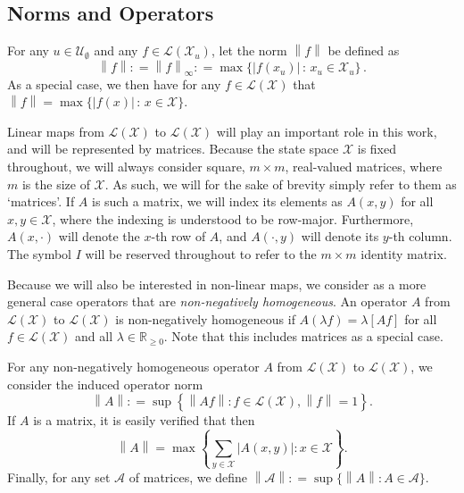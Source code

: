 \documentclass[10pt,a4paper]{paper}
\theoremstyle{definition}
\newcommand{\reals}{\mathbb{R}}
\newcommand{\realsnonneg}{\reals_{\geq 0}}
\newcommand{\states}{\mathcal{X}}
\newcommand{\gambles}{\mathcal{L}}
\newcommand{\gamblesX}{\gambles(\states)}
\newcommand{\norm}[1]{\left\lVert #1 \right\rVert}
\newcommand{\abs}[1]{\left\vert #1 \right\vert}
\newcommand{\coloneqq}{:\!=}
\begin{document}

\subsection{Norms and Operators}\label{sec:func_oper_norm}

For any $u\in\mathcal{U}_\emptyset$ and any $f\in\gambles(\states_u)$, let the norm $\norm{f}$ be defined as
\begin{equation*}
\norm{f} \coloneqq \norm{f}_{\infty} \coloneqq \max\{\abs{f(x_u)}\,:\,x_u\in\states_u\}\,.
\end{equation*}
As a special case, we then have for any $f\in\gamblesX$ that $\norm{f}=\max\{\abs{f(x)}\,:\,x\in\states\}$.

Linear maps from $\gamblesX$ to $\gamblesX$ will play an important role in this work, and will be represented by matrices. Because the state space $\states$ is fixed throughout, we will always consider square, $m\times m$, real-valued matrices, where $m$ is the size of $\states$. As such, we will for the sake of brevity simply refer to them as `matrices'. If $A$ is such a matrix, we will index its elements as $A(x,y)$ for all $x,y\in\states$, where the indexing is understood to be row-major. Furthermore, $A(x,\cdot)$ will denote the $x$-th row of $A$, and $A(\cdot,y)$ will denote its $y$-th column. The symbol $I$ will be reserved throughout to refer to the $m\times m$ identity matrix.

Because we will also be interested in non-linear maps, we consider as a more general case operators that are \emph{non-negatively homogeneous}. An operator $A$ from $\gamblesX$ to $\gamblesX$ is non-negatively homogeneous if $A(\lambda f)=\lambda \left[Af\right]$ for all $f\in\gamblesX$ and all $\lambda\in\realsnonneg$. Note that this includes matrices as a special case.

For any non-negatively homogeneous operator $A$ from $\gamblesX$ to $\gamblesX$, we consider the induced operator norm
\begin{equation}\label{eq:operatornorm}
\norm{A}\coloneqq\sup\left\{\norm{Af}\colon f\in\gamblesX,\norm{f}=1\right\}.
\end{equation}
If $A$ is a matrix, it is easily verified that then
\begin{equation}\label{eq:normofmatrix}
\norm{A}
=
\max\left\{\sum_{y\in\states}\abs{A(x,y)}\colon x\in\states\right\}.
\end{equation}
\noindent
Finally, for any set $\mathcal{A}$ of matrices, we define $\norm{\mathcal{A}}\coloneqq\sup\{\norm{A}\colon A\in\mathcal{A}\}$.
\end{document}

